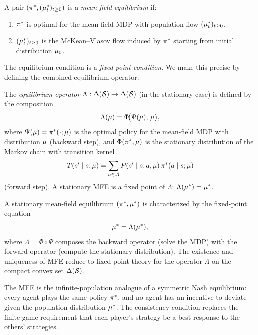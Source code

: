 \documentclass[11pt,a4paper]{article}
\begin{document}
\begin{definition}
\label{def:mfe-general}
A pair $(\pi^*, (\mu_t^*)_{t \geq 0})$ is a
\emph{mean-field equilibrium} if:
\begin{enumerate}[nosep]
  \item $\pi^*$ is optimal for the mean-field MDP with
    population flow $(\mu_t^*)_{t \geq 0}$.
  \item $(\mu_t^*)_{t \geq 0}$ is the McKean--Vlasov flow
    induced by $\pi^*$ starting from initial distribution
    $\mu_0$.
\end{enumerate}
\end{definition}

The equilibrium condition is a \emph{fixed-point condition}.  We
make this precise by defining the combined equilibrium operator.

\begin{definition}
\label{def:equilibrium-operator}
The \emph{equilibrium operator} $\Lambda: \Delta(\mathcal{S})
\to \Delta(\mathcal{S})$ (in the stationary case) is defined by
the composition
\[
  \Lambda(\mu)
  = \Phi\!\bigl(\Psi(\mu),\, \mu\bigr),
\]
where $\Psi(\mu) = \pi^*(\cdot; \mu)$ is the
optimal policy for the mean-field MDP with distribution $\mu$
(backward step), and $\Phi(\pi^*, \mu)$ is the stationary
distribution of the Markov chain with transition kernel
\[
  T(s' \mid s; \mu)
  = \sum_{a \in \mathcal{A}}
    P(s' \mid s, a, \mu)\, \pi^*(a \mid s; \mu)
\]
(forward step).  A stationary MFE is a fixed point of $\Lambda$:
$\Lambda(\mu^*) = \mu^*$.
\end{definition}

\begin{keyresult}[title={Mean-Field Equilibrium as a Fixed Point}]
A stationary mean-field equilibrium $(\pi^*, \mu^*)$ is
characterized by the fixed-point equation
\[
  \mu^* = \Lambda(\mu^*),
\]
where $\Lambda = \Phi \circ \Psi$ composes the backward operator
(solve the MDP) with the forward operator (compute the stationary
distribution).  The existence and uniqueness of MFE reduce to
fixed-point theory for the operator $\Lambda$ on the compact convex
set $\Delta(\mathcal{S})$.
\end{keyresult}

\begin{remark}
\label{rem:analogy-ne}
The MFE is the infinite-population analogue of a symmetric Nash
equilibrium: every agent plays the same policy $\pi^*$, and no
agent has an incentive to deviate given the population distribution
$\mu^*$.  The consistency condition replaces the finite-game
requirement that each player's strategy be a best response to the
others' strategies.
\end{remark}
\end{document}
